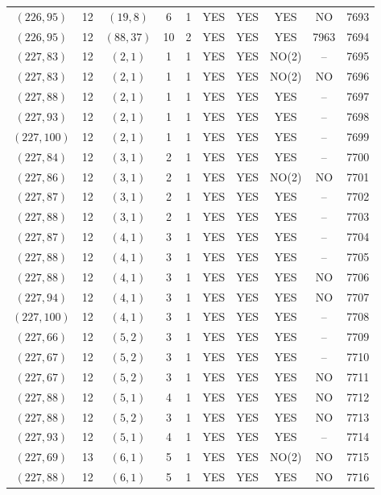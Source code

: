 \begin{longtable}{|c|c|c|c|c|c|c|c|c|c|}
$(226, 95)$ & 12 & $(19, 8)$ & 6 & 1 & YES & YES & YES & NO & 7693\\
$(226, 95)$ & 12 & $(88, 37)$ & 10 & 2 & YES & YES & YES & 7963 & 7694\\
$(227, 83)$ & 12 & $(2, 1)$ & 1 & 1 & YES & YES & NO(2) & -- & 7695\\
$(227, 83)$ & 12 & $(2, 1)$ & 1 & 1 & YES & YES & NO(2) & NO & 7696\\
$(227, 88)$ & 12 & $(2, 1)$ & 1 & 1 & YES & YES & YES & -- & 7697\\
$(227, 93)$ & 12 & $(2, 1)$ & 1 & 1 & YES & YES & YES & -- & 7698\\
$(227, 100)$ & 12 & $(2, 1)$ & 1 & 1 & YES & YES & YES & -- & 7699\\
$(227, 84)$ & 12 & $(3, 1)$ & 2 & 1 & YES & YES & YES & -- & 7700\\
$(227, 86)$ & 12 & $(3, 1)$ & 2 & 1 & YES & YES & NO(2) & NO & 7701\\
$(227, 87)$ & 12 & $(3, 1)$ & 2 & 1 & YES & YES & YES & -- & 7702\\
$(227, 88)$ & 12 & $(3, 1)$ & 2 & 1 & YES & YES & YES & -- & 7703\\
$(227, 87)$ & 12 & $(4, 1)$ & 3 & 1 & YES & YES & YES & -- & 7704\\
$(227, 88)$ & 12 & $(4, 1)$ & 3 & 1 & YES & YES & YES & -- & 7705\\
$(227, 88)$ & 12 & $(4, 1)$ & 3 & 1 & YES & YES & YES & NO & 7706\\
$(227, 94)$ & 12 & $(4, 1)$ & 3 & 1 & YES & YES & YES & NO & 7707\\
$(227, 100)$ & 12 & $(4, 1)$ & 3 & 1 & YES & YES & YES & -- & 7708\\
$(227, 66)$ & 12 & $(5, 2)$ & 3 & 1 & YES & YES & YES & -- & 7709\\
$(227, 67)$ & 12 & $(5, 2)$ & 3 & 1 & YES & YES & YES & -- & 7710\\
$(227, 67)$ & 12 & $(5, 2)$ & 3 & 1 & YES & YES & YES & NO & 7711\\
$(227, 88)$ & 12 & $(5, 1)$ & 4 & 1 & YES & YES & YES & NO & 7712\\
$(227, 88)$ & 12 & $(5, 2)$ & 3 & 1 & YES & YES & YES & NO & 7713\\
$(227, 93)$ & 12 & $(5, 1)$ & 4 & 1 & YES & YES & YES & -- & 7714\\
$(227, 69)$ & 13 & $(6, 1)$ & 5 & 1 & YES & YES & NO(2) & NO & 7715\\
$(227, 88)$ & 12 & $(6, 1)$ & 5 & 1 & YES & YES & YES & NO & 7716\\

\end{longtable}
